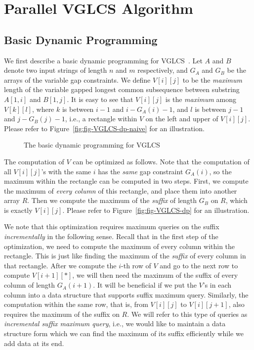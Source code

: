 \section{Parallel VGLCS Algorithm} \label{sec:parallelVGLCS}

\subsection{Basic Dynamic Programming}

We first describe a basic dynamic programming for
VGLCS~\cite{Peng2011TheLC}. Let $A$ and $B$ denote two input strings of
length $n$ and $m$ respectively, and $G_A$ and $G_B$ be the arrays of
the variable gap constraints.  We define $V[i][j]$ to be the {\em
maximum} length of the variable gapped longest common subsequence
between substring $A[1, i]$ and $B[1, j]$.  It is easy to see that
$V[i][j]$ is the {\em maximum} among $V[k][l]$, where $k$ is between
$i-1$ and $i-G_A(i)-1$, and $l$ is between $j-1$ and $j-G_B(j)-1$, i.e.,
a rectangle within $V$ on the left and upper of $V[i][j]$.  Please refer
to Figure~\ref{fig:fig-VGLCS-dp-naive} for an illustration.

\begin{figure}[!thb]
  \centering {} 
  \caption{The basic dynamic programming for VGLCS}
  \label{fig:basic-dp-VGLCS}
\end{figure}

The computation of $V$ can be optimized as follows.  Note that the
computation of all $V[i][j]$'s with the same $i$ has the {\em same} gap
constraint $G_A(i)$, so the maximum within the rectangle can be computed
in two steps.  First, we compute the maximum of {\em every column} of
this rectangle, and place them into another array $R$. Then we compute
the maximum of the {\em suffix} of length $G_B$ on $R$, which is exactly
$V[i][j]$.  Please refer to Figure~\ref{fig:fig-VGLCS-dp} for an
illustration.

We note that this optimization requires maximum queries on the suffix
{\em incrementally} in the following sense.  Recall that in the first
step of the optimization, we need to compute the maximum of every column
within the rectangle.  This is just like finding the maximum of the {\em
suffix} of every column in that rectangle.  After we compute the $i$-th
row of $V$ and go to the next row to compute $V[i+1][*]$, we will then
need the maximum of the suffix of every column of length $G_A(i+1)$. It
will be beneficial if we put the $V$'s in each column into a data
structure that supports suffix maximum query.  Similarly, the
computation within the same row, that is, from $V[i][j]$ to $V[i][j+1]$,
also requires the maximum of the suffix on $R$.  We will refer to this
type of queries as {\em incremental suffix maximum query}, i.e., we
would like to maintain a data structure form which we can find the
maximum of its suffix efficiently while we add data at its end.

